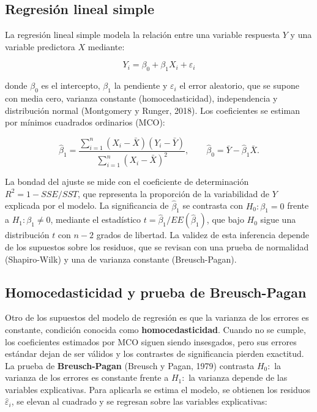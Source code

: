 \documentclass[12pt]{article}
\begin{document}
\subsection*{Regresión lineal simple}

La regresión lineal simple modela la relación entre una variable
respuesta \(Y\) y una variable predictora \(X\) mediante:

\[
Y_i = \beta_0 + \beta_1 X_i + \varepsilon_i
\]

donde \(\beta_0\) es el intercepto, \(\beta_1\) la pendiente y
\(\varepsilon_i\) el error aleatorio, que se supone con media cero,
varianza constante (homocedasticidad), independencia y distribución
normal (Montgomery y Runger, 2018). Los coeficientes se estiman por mínimos
cuadrados ordinarios (MCO):

\[
\hat{\beta}_1 = \frac{\sum_{i=1}^{n} (X_i - \bar{X})(Y_i - \bar{Y})}
{\sum_{i=1}^{n} (X_i - \bar{X})^2},
\qquad
\hat{\beta}_0 = \bar{Y} - \hat{\beta}_1 \bar{X}.
\]

La bondad del ajuste se mide con el coeficiente de determinación
\(R^2 = 1 - SSE/SST\), que representa la proporción de la variabilidad
de \(Y\) explicada por el modelo. La significancia de \(\hat{\beta}_1\)
se contrasta con \(H_0: \beta_1 = 0\) frente a
\(H_1: \beta_1 \neq 0\), mediante el estadístico
\(t = \hat{\beta}_1 / EE(\hat{\beta}_1)\), que bajo \(H_0\) sigue una
distribución \(t\) con \(n-2\) grados de libertad. La validez de esta
inferencia depende de los supuestos sobre los residuos, que se revisan
con una prueba de normalidad (Shapiro-Wilk) y una de varianza constante
(Breusch-Pagan).

\subsection*{Homocedasticidad y prueba de Breusch-Pagan}

Otro de los supuestos del modelo de regresión es que la varianza de los
errores es constante, condición conocida como \textbf{homocedasticidad}.
Cuando no se cumple, los coeficientes estimados por MCO siguen siendo
insesgados, pero sus errores estándar dejan de ser válidos y los
contrastes de significancia pierden exactitud. La prueba de
\textbf{Breusch-Pagan} (Breusch y Pagan, 1979) contrasta
\(H_0:\) la varianza de los errores es constante frente a
\(H_1:\) la varianza depende de las variables explicativas. Para
aplicarla se estima el modelo, se obtienen los residuos
\(\hat{\varepsilon}_i\), se elevan al cuadrado y se regresan sobre las
variables explicativas:
\end{document}

